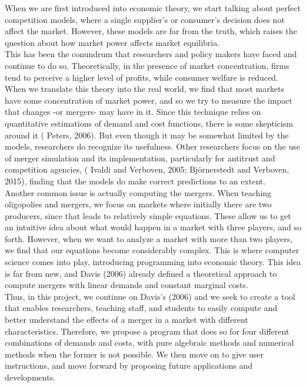 \documentclass[12pt]{article}
\begin{document}
When we are first introduced into economic theory, we start talking about perfect competition models, where a single supplier's or consumer's decision does not affect the market. However, these models are far from the truth, which raises the question about how market power affects market equilibria.\\
This has been the conundrum that researchers and policy makers have faced and continue to do so. Theoretically, in the presence of market concentration, firms tend to perceive a higher level of profits, while consumer welfare is reduced. When we translate this theory into the real world, we find that most markets have some concentration of market power, and so we try to measure the impact that changes -or mergers- may have in it. Since this technique relies on quantitative estimations of demand and cost functions, there is some skepticism around it (\cite{peters} Peters, 2006). But even though it may be somewhat limited by the models, researchers do recognize its usefulness. Other researchers focus on the use of merger simulation and its implementation, particularly for antitrust and competition agencies, (\cite{ivaldi} \cite{bjorn} Ivaldi and Verboven, 2005; Bj\"{o}rnerstedt and Verboven, 2015), finding that the models do make correct predictions to an extent. \\
Another common issue is actually computing the mergers. When teaching oligopolies and mergers, we focus on markets where initially there are two producers, since that leads to relatively simple equations. These allow us to get an intuitive idea about what would happen in a market with three players, and so forth. However, when we want to analyze a market with more than two players, we find that our equations become considerably complex. This is where computer science comes into play, introducing programming into economic theory. This idea is far from new, and Davis (2006) \cite{davis} already defined a theoretical approach to compute mergers with linear demands and constant marginal costs.\\
Thus, in this project, we continue on Davis's (2006) \cite{davis} and we seek to create a tool that enables researchers, teaching staff, and students to easily compute and better understand the effects of a merger in a market with different characteristics. Therefore, we propose a program that does so for four different combinations of demands and costs, with pure algebraic methods and numerical methods when the former is not possible. We then move on to give user instructions, and move forward by proposing future applications and developments. 
\end{document}
